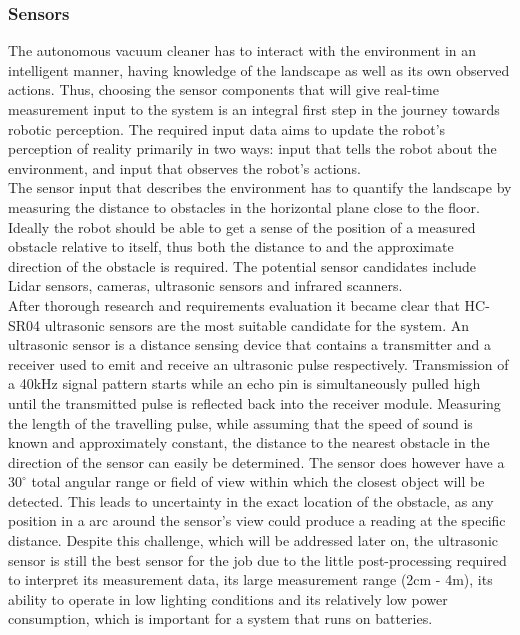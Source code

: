 \subsubsection{Sensors}
\label{sec:sensors}

The autonomous vacuum cleaner has to interact with the environment in an intelligent manner, having knowledge of the landscape as well as its own observed actions. Thus, choosing the sensor components that will give real-time measurement input to the system is an integral first step in the journey towards robotic perception. The required input data aims to update the robot's perception of reality primarily in two ways: input that tells the robot about the environment, and input that observes the robot's actions. \\

The sensor input that describes the environment has to quantify the landscape by measuring the distance to obstacles in the horizontal plane close to the floor. Ideally the robot should be able to get a sense of the position of a measured obstacle relative to itself, thus both the distance to and the approximate direction of the obstacle is required. The potential sensor candidates include Lidar sensors, cameras, ultrasonic sensors and infrared scanners. \\

After thorough research and requirements evaluation it became clear that HC-SR04 ultrasonic sensors are the most suitable candidate for the system. An ultrasonic sensor is a distance sensing device that contains a transmitter and a receiver used to emit and receive an ultrasonic pulse respectively. Transmission of a 40kHz signal pattern starts while an echo pin is simultaneously pulled high until the transmitted pulse is reflected back into the receiver module. Measuring the length of the travelling pulse, while assuming that the speed of sound is known and approximately constant, the distance to the nearest obstacle in the direction of the sensor can easily be determined. The sensor does however have a $30^\circ$ total angular range or field of view within which the closest object will be detected. This leads to uncertainty in the exact location of the obstacle, as any position in a arc around the sensor's view could produce a reading at the specific distance. Despite this challenge, which will be addressed later on, the ultrasonic sensor is still the best sensor for the job due to the little post-processing required to interpret its measurement data, its large measurement range (2cm - 4m), its ability to operate in low lighting conditions and its relatively low power consumption, which is important for a system that runs on batteries. \\

